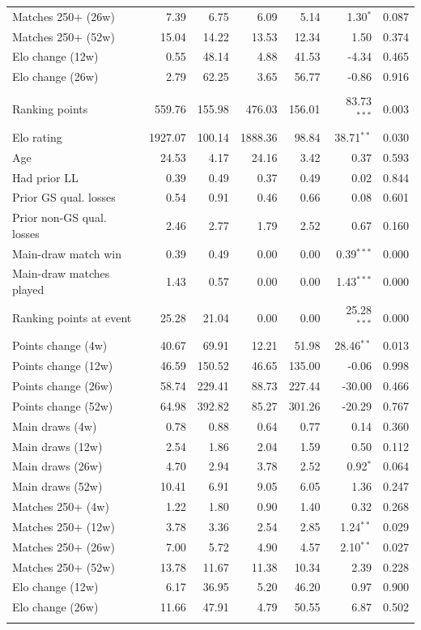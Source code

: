 \begin{tabular}{l rr rr rr}
\quad Matches 250+ (26w) & 7.39 & 6.75 & 6.09 & 5.14 & 1.30$^{*}$ & 0.087 \\
\quad Matches 250+ (52w) & 15.04 & 14.22 & 13.53 & 12.34 & 1.50 & 0.374 \\
\quad Elo change (12w) & 0.55 & 48.14 & 4.88 & 41.53 & -4.34 & 0.465 \\
\quad Elo change (26w) & 2.79 & 62.25 & 3.65 & 56.77 & -0.86 & 0.916 \\
\addlinespace
\multicolumn{7}{l}{\textit{Panel: WTA (N = 132, LL = 54, Control = 78)}} \\
\addlinespace
\quad Ranking points & 559.76 & 155.98 & 476.03 & 156.01 & 83.73$^{***}$ & 0.003 \\
\quad Elo rating & 1927.07 & 100.14 & 1888.36 & 98.84 & 38.71$^{**}$ & 0.030 \\
\quad Age & 24.53 & 4.17 & 24.16 & 3.42 & 0.37 & 0.593 \\
\quad Had prior LL & 0.39 & 0.49 & 0.37 & 0.49 & 0.02 & 0.844 \\
\quad Prior GS qual. losses & 0.54 & 0.91 & 0.46 & 0.66 & 0.08 & 0.601 \\
\quad Prior non-GS qual. losses & 2.46 & 2.77 & 1.79 & 2.52 & 0.67 & 0.160 \\
\quad Main-draw match win & 0.39 & 0.49 & 0.00 & 0.00 & 0.39$^{***}$ & 0.000 \\
\quad Main-draw matches played & 1.43 & 0.57 & 0.00 & 0.00 & 1.43$^{***}$ & 0.000 \\
\quad Ranking points at event & 25.28 & 21.04 & 0.00 & 0.00 & 25.28$^{***}$ & 0.000 \\
\quad Points change (4w) & 40.67 & 69.91 & 12.21 & 51.98 & 28.46$^{**}$ & 0.013 \\
\quad Points change (12w) & 46.59 & 150.52 & 46.65 & 135.00 & -0.06 & 0.998 \\
\quad Points change (26w) & 58.74 & 229.41 & 88.73 & 227.44 & -30.00 & 0.466 \\
\quad Points change (52w) & 64.98 & 392.82 & 85.27 & 301.26 & -20.29 & 0.767 \\
\quad Main draws (4w) & 0.78 & 0.88 & 0.64 & 0.77 & 0.14 & 0.360 \\
\quad Main draws (12w) & 2.54 & 1.86 & 2.04 & 1.59 & 0.50 & 0.112 \\
\quad Main draws (26w) & 4.70 & 2.94 & 3.78 & 2.52 & 0.92$^{*}$ & 0.064 \\
\quad Main draws (52w) & 10.41 & 6.91 & 9.05 & 6.05 & 1.36 & 0.247 \\
\quad Matches 250+ (4w) & 1.22 & 1.80 & 0.90 & 1.40 & 0.32 & 0.268 \\
\quad Matches 250+ (12w) & 3.78 & 3.36 & 2.54 & 2.85 & 1.24$^{**}$ & 0.029 \\
\quad Matches 250+ (26w) & 7.00 & 5.72 & 4.90 & 4.57 & 2.10$^{**}$ & 0.027 \\
\quad Matches 250+ (52w) & 13.78 & 11.67 & 11.38 & 10.34 & 2.39 & 0.228 \\
\quad Elo change (12w) & 6.17 & 36.95 & 5.20 & 46.20 & 0.97 & 0.900 \\
\quad Elo change (26w) & 11.66 & 47.91 & 4.79 & 50.55 & 6.87 & 0.502 \\
\addlinespace
\bottomrule
\end{tabular}
